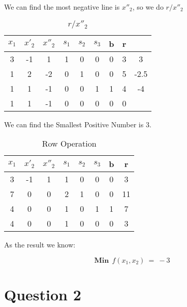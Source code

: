 \documentclass{article}
\begin{document}
  We can find the most negative line is $x''_2$, so we do $r/x''_2$

  \begin{table}[H]
  \centering
  \caption{$r/x''_2$}
  \begin{tabular}{|c|c|c|c|c|c|c|c|c|}
  \hline
  $x_1$ & $x'_2$ & $x''_2$  & $s_1$ & $s_2$ & $s_3$ & b & r &      \\ \hline
  3    & -1    & 1       & 1    & 0    & 0    & 0 & 3 & \cellcolor{yellow}3    \\ \hline
  1    & 2     & -2      & 0    & 1    & 0    & 0 & 5 & -2.5 \\ \hline
  1    & 1     & -1      & 0    & 0    & 1    & 1 & 4 & -4   \\ \hline
  1    & 1     & \cellcolor{green}-1      & 0    & 0    & 0    & 0 & 0 &      \\ \hline
  \end{tabular}
  \end{table}

  We can find the Smallest Positive Number is $3$.

  \begin{table}[H]
  \centering
  \caption{Row Operation}
  \begin{tabular}{|c|c|c|c|c|c|c|c|}
  \hline
  $x_1$ & $x'_2$ & $x''_2$  & $s_1$ & $s_2$ & $s_3$ & b & r \\ \hline
  3    & -1    & 1       & 1    & 0    & 0    & 0 & 3  \\ \hline
  7    & 0     & 0       & 2    & 1    & 0    & 0 & 11 \\ \hline
  4    & 0     & 0       & 1    & 0    & 1    & 1 & 7  \\ \hline
  4    & 0     & 0       & 1    & 0    & 0    & 0 & 3  \\ \hline
  \end{tabular}
  \end{table}

  As the result we know:

  $$ \textbf{Min}\:\: f(x_1,x_2) \: =\: -3 $$


  \section{Question 2}
\end{document}
